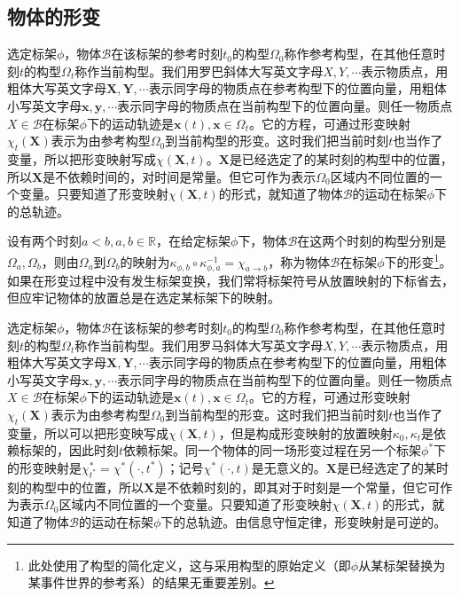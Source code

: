 \documentclass[main.tex]{subfiles}
\begin{document}
\subsection{物体的形变}
选定标架$\phi$，物体$\mathcal{B}$在该标架的参考时刻$t_0$的构型$\Omega_0$称作参考构型，在其他任意时刻$t$的构型$\Omega_t$称作当前构型。我们用罗巴斜体大写英文字母$X,Y,\cdots$表示物质点，用粗体大写英文字母$\mathbf{X},\mathbf{Y},\cdots$表示同字母的物质点在参考构型下的位置向量，用粗体小写英文字母$\mathbf{x},\mathbf{y},\cdots$表示同字母的物质点在当前构型下的位置向量。则任一物质点$X\in\mathcal{B}$在标架$\phi$下的运动轨迹是$\mathbf{x}\left(t\right),\mathbf{x}\in\Omega_t$。它的方程，可通过形变映射$\chi_t\left(\mathbf{X}\right)$表示为由参考构型$\Omega_0$到当前构型的形变。这时我们把当前时刻$t$也当作了变量，所以把形变映射写成$\chi\left(\mathbf{X},t\right)$。$\mathbf{X}$是已经选定了的某时刻的构型中的位置，所以$\mathbf{X}$是不依赖时间的，对时间是常量。但它可作为表示$\Omega_0$区域内不同位置的一个变量。只要知道了形变映射$\chi\left(\mathbf{X},t\right)$的形式，就知道了物体$\mathcal{B}$的运动在标架$\phi$下的总轨迹。

设有两个时刻$a<b,a,b\in\mathbb{R}$，在给定标架$\phi$下，物体$\mathcal{B}$在这两个时刻的构型分别是$\Omega_a,\Omega_b$，则由$\Omega_a$到$\Omega_b$的映射为$\kappa^{}_{\phi,b}\circ\kappa_{\phi,a}^{-1}=\chi_{a\to b}$，称为物体$\mathcal{B}$在标架$\phi$下的形变\footnote{此处使用了构型的简化定义，这与采用构型的原始定义（即$\phi$从某标架替换为某事件世界的参考系）的结果无重要差别。}。如果在形变过程中没有发生标架变换，我们常将标架符号从放置映射的下标省去，但应牢记物体的放置总是在选定某标架下的映射。

选定标架$\phi$，物体$\mathcal{B}$在该标架的参考时刻$t_0$的构型$\Omega_0$称作参考构型，在其他任意时刻$t$的构型$\Omega_t$称作当前构型。我们用罗马斜体大写英文字母$X,Y,\cdots$表示物质点，用粗体大写英文字母$\mathbf{X},\mathbf{Y},\cdots$表示同字母的物质点在参考构型下的位置向量，用粗体小写英文字母$\mathbf{x},\mathbf{y},\cdots$表示同字母的物质点在当前构型下的位置向量。则任一物质点$X\in\mathcal{B}$在标架$\phi$下的运动轨迹是$\mathbf{x}\left(t\right),\mathbf{x}\in\Omega_t$。它的方程，可通过形变映射$\chi_t\left(\mathbf{X}\right)$表示为由参考构型$\Omega_0$到当前构型的形变。这时我们把当前时刻$t$也当作了变量，所以可以把形变映写成$\chi\left(\mathbf{X},t\right)$，但是构成形变映射的放置映射$\kappa_0,\kappa_t$是依赖标架的，因此时刻$t$依赖标架。同一个物体的同一场形变过程在另一个标架$\phi
^*$下的形变映射是$\chi^*_{t^*}=\chi^*\left(\cdot,t^*\right)$；记号$\chi^*\left(\cdot,t\right)$是无意义的。$\mathbf{X}$是已经选定了的某时刻的构型中的位置，所以$\mathbf{X}$是不依赖时刻的，即其对于时刻是一个常量，但它可作为表示$\Omega_0$区域内不同位置的一个变量。只要知道了形变映射$\chi\left(\mathbf{X},t\right)$的形式，就知道了物体$\mathcal{B}$的运动在标架$\phi$下的总轨迹。由信息守恒定律，形变映射是可逆的。
\end{document}
